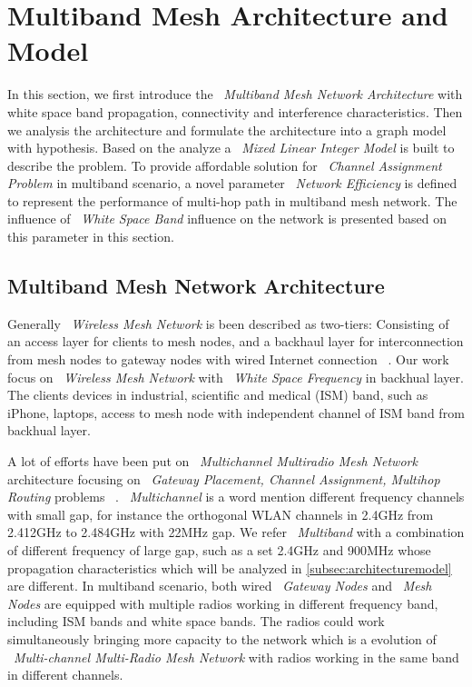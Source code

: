\section{Multiband Mesh Architecture and Model}
\label{sec:model}

In this section, we first introduce the 
~\emph{Multiband Mesh Network Architecture}
with white space band propagation, connectivity and interference characteristics.
Then we analysis the architecture and formulate the architecture into a graph model with hypothesis.
Based on the analyze a ~\emph{Mixed Linear Integer Model} is built to describe the problem. 
To provide affordable solution for ~\emph{Channel Assignment Problem} in multiband scenario, a novel parameter ~\emph{Network Efficiency} is defined to represent the performance of multi-hop path in multiband mesh network.
The influence of ~\emph{White Space Band} influence on the network is presented based on this parameter in this section.

\subsection{Multiband Mesh Network Architecture}
\label{subsec:architecture}
Generally ~\emph{Wireless Mesh Network} is been described as two-tiers:
Consisting of an access layer for clients to mesh nodes, and a backhaul layer for interconnection from mesh nodes to gateway nodes with wired Internet connection ~\cite{akyildiz2005wireless}.
Our work focus on ~\emph{Wireless Mesh Network} with ~\emph{White Space Frequency} in backhual layer. 
The clients devices in industrial, scientific and medical (ISM) band, such as iPhone, laptops, access to mesh node with independent channel of ISM band from backhual layer. 

A lot of efforts have been put on ~\emph{Multichannel Multiradio Mesh Network} architecture focusing on ~\emph{Gateway Placement, Channel Assignment, Multihop Routing} problems ~\cite{si2010overview}.
~\emph{Multichannel} is a word mention different frequency channels with small gap, for instance the orthogonal WLAN channels in 2.4GHz from 2.412GHz to 2.484GHz with 22MHz gap.
We refer ~\emph{Multiband} with a combination of different frequency of large gap, such as a set 2.4GHz and 900MHz whose propagation characteristics which will be analyzed in \ref{subsec:architecturemodel} are different.
In multiband scenario, both wired ~\emph{Gateway Nodes} and ~\emph{Mesh Nodes} are equipped with multiple radios working in different frequency band, including ISM bands and white space bands. The radios could work simultaneously bringing more capacity to the network which is a evolution of ~\emph{Multi-channel Multi-Radio Mesh Network} with radios working in the same band in different channels.


